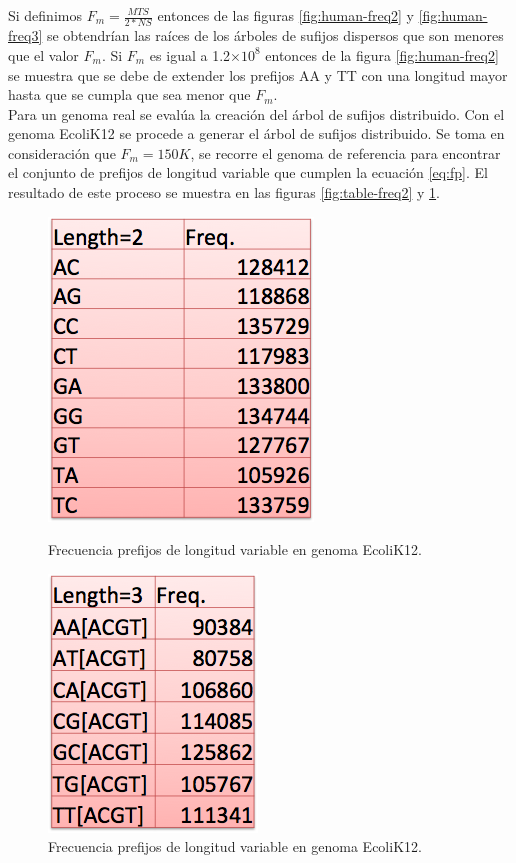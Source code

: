 \documentclass[12pt,a4paper]{article}
\providecommand{\e}[1]{\ensuremath{\times 10^{#1}}}
\begin{document}
\indent
Si definimos $F_{m}=\frac{MTS}{2*NS}$ entonces de las figuras \ref{fig:human-freq2} y \ref{fig:human-freq3} se obtendrían las raíces de los árboles de sufijos dispersos que son menores que el valor $F_{m}$. Si $F_{m}$ es igual a 1.2\e{8} entonces de la figura \ref{fig:human-freq2} se muestra que se debe de extender los prefijos AA y TT con una longitud mayor hasta que se cumpla que sea menor que $F_{m}$.\\
\indent
Para un genoma real se evalúa la creación del árbol de sufijos distribuido. Con el genoma EcoliK12 se procede a generar el árbol de sufijos distribuido. Se toma en consideración que $F_{m}=150K$, se recorre el genoma de referencia para encontrar el conjunto de prefijos de longitud variable que cumplen la ecuación \ref{eq:fp}. El resultado de este proceso se muestra en las figuras \ref{fig:table-freq2} y \ref{fig:table-freq3}.\\
\begin{figure}[!ht]
\begin{minipage}[b]{0.5\linewidth}
\centering
\includegraphics[scale=0.4]{table-freq2.png}
\caption{Frecuencia prefijos de longitud variable en genoma EcoliK12.}
\label{fig:table-freq2}
\end{minipage}
\begin{minipage}[b]{0.5\linewidth}
\centering
\includegraphics[scale=0.4]{table-freq3.png}
\caption{Frecuencia prefijos de longitud variable en genoma EcoliK12.}
\label{fig:table-freq3}
\end{minipage}
\end{figure}
\end{document}
